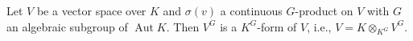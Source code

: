 Let $V$ be a vector space over $K$ and $\sigma(v)$ a continuous $G$-product on $V$ with $G$ an algebraic subgroup of $\operatorname{Aut} K$. Then $V^G$ is a $K^G$-form of $V$, i.e., $V = K \otimes_{K^G} V^G$.
